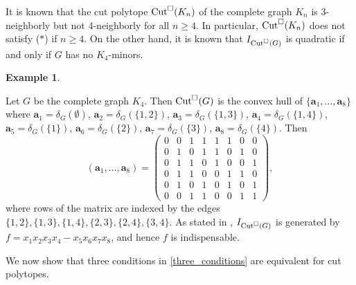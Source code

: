 \documentclass[12pt]{amsart}
\theoremstyle{definition}
\newtheorem{example}[thm]{Example}
\numberwithin{thm}{section}
\numberwithin{equation}{section}
\def\ab{{\mathbf a}}
\begin{document}
    It is known {\cite[Section 4.2]{Z}} that 
    the cut polytope
    ${\rm Cut}^\Box(K_n)$ of the complete graph $K_n$ is 3-neighborly but not 4-neighborly 
    for all $n\ge 4$.
    In particular, ${\rm Cut}^\Box(K_n)$ does not satisfy ($*$) if $n \ge 4$.
    On the other hand, it is known \cite{Eng} that $I_{{\rm Cut}^\Box(G)}$ is quadratic if and only if $G$ has no $K_4$-minors.

\begin{example}\label{k4}

    Let $G$ be the complete graph $K_4$.
    Then ${\rm Cut}^\Box(G)$ is the convex hull of $\{\ab_1, \dots, \ab_8\}$ where
    $\ab_1 = \delta_G(\emptyset)$, $\ab_2 = \delta_G(\{1,2\})$, $\ab_3 = \delta_G(\{1,3\})$, $\ab_4 = \delta_G(\{1,4\})$, $\ab_5 = \delta_G(\{1\})$, $\ab_6 = \delta_G(\{2\})$, $\ab_7 = \delta_G(\{3\})$, $\ab_8 = \delta_G(\{4\})$.
    Then
    \[
    (\ab_1, \dots, \ab_8) = 
    \left(
    \begin{array}{cccccccc}
    0 & 0 & 1 & 1 & 1 & 1 & 0 & 0\\
    0 & 1 & 0 & 1 & 1 & 0 & 1 & 0\\
    0 & 1 & 1 & 0 & 1 & 0 & 0 & 1\\
    0 & 1 & 1 & 0 & 0 & 1 & 1 & 0\\
    0 & 1 & 0 & 1 & 0 & 1 & 0 & 1\\
    0 & 0 & 1 & 1 & 0 & 0 & 1 & 1
    \end{array}
    \right),
    \]
    where rows of the matrix are indexed by the edges $
    \{1,2\},\{1,3\},\{1,4\},\{2,3\},\{2,4\},\{3,4\}$.
    As stated in \cite[Example 1.1]{SS}, $I_{{\rm Cut}^\Box(G)}$ is generated by $f=x_1x_2x_3x_4 - x_5x_6x_7x_8$, and hence $f$ is indispensable.
\end{example}


We now show that three conditions in \eqref{three_conditions} are equivalent for cut polytopes.
\end{document}
